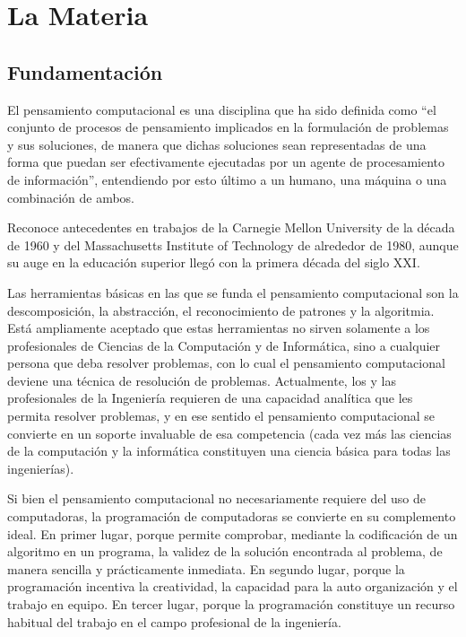 \documentclass[
  letterpaper,
  DIV=11,
  numbers=noendperiod]{scrreprt}
\begin{document}

\chapter*{La Materia}\label{la-materia}


\section*{Fundamentación}\label{fundamentaciuxf3n}


El pensamiento computacional es una disciplina que ha sido definida como
``el conjunto de procesos de pensamiento implicados en la formulación de
problemas y sus soluciones, de manera que dichas soluciones sean
representadas de una forma que puedan ser efectivamente ejecutadas por
un agente de procesamiento de información'', entendiendo por esto último
a un humano, una máquina o una combinación de ambos.

Reconoce antecedentes en trabajos de la Carnegie Mellon University de la
década de 1960 y del Massachusetts Institute of Technology de alrededor
de 1980, aunque su auge en la educación superior llegó con la primera
década del siglo XXI.

Las herramientas básicas en las que se funda el pensamiento
computacional son la descomposición, la abstracción, el reconocimiento
de patrones y la algoritmia. Está ampliamente aceptado que estas
herramientas no sirven solamente a los profesionales de Ciencias de la
Computación y de Informática, sino a cualquier persona que deba resolver
problemas, con lo cual el pensamiento computacional deviene una técnica
de resolución de problemas. Actualmente, los y las profesionales de la
Ingeniería requieren de una capacidad analítica que les permita resolver
problemas, y en ese sentido el pensamiento computacional se convierte en
un soporte invaluable de esa competencia (cada vez más las ciencias de
la computación y la informática constituyen una ciencia básica para
todas las ingenierías).

Si bien el pensamiento computacional no necesariamente requiere del uso
de computadoras, la programación de computadoras se convierte en su
complemento ideal. En primer lugar, porque permite comprobar, mediante
la codificación de un algoritmo en un programa, la validez de la
solución encontrada al problema, de manera sencilla y prácticamente
inmediata. En segundo lugar, porque la programación incentiva la
creatividad, la capacidad para la auto organización y el trabajo en
equipo. En tercer lugar, porque la programación constituye un recurso
habitual del trabajo en el campo profesional de la ingeniería.
\end{document}
